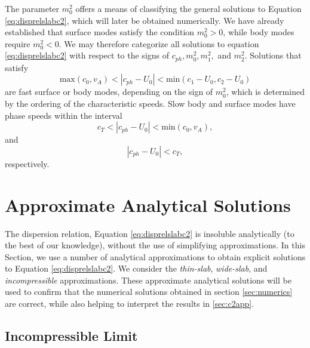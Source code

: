 The parameter $m_0^2$ offers a means of classifying the general solutions to Equation \eqref{eq:disprelslabc2}, which will later be obtained numerically.
We have already established that surface modes satisfy the condition $m_0^2 > 0$, while body modes require $m_0^2 < 0$.
We may therefore categorize all solutions to equation \eqref{eq:disprelslabc2} with respect to the signs of $c_{ph}, m_0^2, m_1^2,$ and $m_2^2$.
Solutions that satisfy
%
\begin{equation}
\textrm{max}(c_0, v_A) < |c_{ph} - U_0| < \textrm{min}(c_1 - U_0, c_2 - U_0)
\end{equation}
%
are fast surface or body modes, depending on the sign of $m_0^2$, which is determined by the ordering of the characteristic speeds.
Slow body and surface modes have phase speeds within the interval 
%
\begin{equation}
c_T < |c_{ph} - U_0| < \textrm{min}(c_0, v_A),
\end{equation}
%
and
%
\begin{equation}
|c_{ph} - U_0| < c_T,
\end{equation}
%
respectively.



\section{Approximate Analytical Solutions}
\label{sec:analytical}

The dispersion relation, Equation \eqref{eq:disprelslabc2} is insoluble analytically (to the best of our knowledge), without the use of simplifying approximations.
In this Section, we use a number of analytical approximations to obtain explicit solutions to Equation \eqref{eq:disprelslabc2}.
We consider the \emph{thin-slab}, \emph{wide-slab}, and \emph{incompressible} approximations.
These approximate analytical solutions will be used to confirm that the numerical solutions obtained in section \ref{sec:numerics} are correct, while also helping to interpret the results in \ref{sec:c2app}.



\subsection{Incompressible Limit}
\label{subsec:incompressible}

